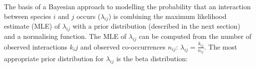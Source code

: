 \documentclass[12pt]{article}
\begin{document}
\begin{spacing}{2.0}
  






    The basis of a Bayesian approach to modelling the probability that an interaction between species $i$ and $j$ occurs ($\lambda_{ij}$) is combining the maximum likelihood estimate (MLE) of $\lambda_{ij}$ with a prior distribution (described in the next section) and a normalising function. The MLE of $\lambda_{ij}$ can be computed from the number of observed interactions $k_ij$ and observed co-occurrences $n_{ij}$: $\lambda_{ij}=\frac{k_{ij}}{n_{ij}}$. The most appropriate prior distribution for $\lambda_{ij}$ is the beta distribution:



\end{spacing}
\end{document}
